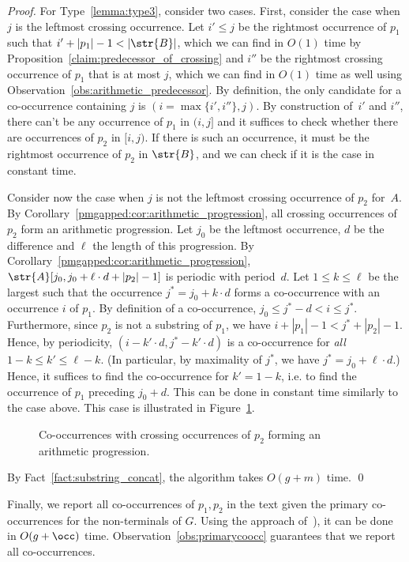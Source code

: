 \begin{proof}
For Type~\ref{lemma:type3}, consider two cases. First, consider the case when $j$ is the leftmost crossing occurrence. Let $i' \le j$ be the rightmost occurrence of $p_1$ such that $i'+|p_1|-1 < |\str{B}|$, which we can find in $O(1)$ time by Proposition~\ref{claim:predecessor_of_crossing} and $i''$ be the rightmost crossing occurrence of $p_1$ that is at most $j$, which we can find in $O(1)$ time as well using Observation~\ref{obs:arithmetic_predecessor}. By definition, the only candidate for a co-occurrence containing $j$ is $(i = \max\{i',i''\},j)$. By construction of~$i'$ and $i''$, there can't be any  occurrence of $p_1$ in $(i,j]$ and it suffices to check whether there are occurrences of $p_2$ in $[i,j)$. If there is such an occurrence, it must be the rightmost occurrence of $p_2$ in $\str{B}$, and we can check if it is the case in constant time. 

Consider now the case when $j$ is not the leftmost crossing occurrence of $p_2$ for~$A$.
By Corollary~\ref{pmgapped:cor:arithmetic_progression}, all crossing occurrences of $p_2$ form an arithmetic progression. Let $j_0$ be the leftmost occurrence, $d$ be the difference and $\ell$ the length of this progression. By Corollary~\ref{pmgapped:cor:arithmetic_progression}, $\str{A}[j_0, j_0+\ell \cdot d+|p_2|-1]$ is periodic with period~$d$. Let $1 \le k \le \ell$ be the largest such that the occurrence $j^\ast = j_0+k \cdot d$ forms a co-occurrence with an occurrence $i$ of $p_1$. By definition of a co-occurrence, $j_0 \le j^\ast-d < i \le j^\ast$. Furthermore, since $p_2$ is not a substring of $p_1$, we have $i+|p_1|-1 < j^\ast+|p_2|-1$. Hence, by periodicity, $(i-k'\cdot d, j^\ast-k' \cdot d)$ is a co-occurrence for \emph{all} $1-k \le k' \le \ell-k$. (In particular, by maximality of $j^\ast$, we have $j^\ast = j_0+\ell\cdot d$.) Hence, it suffices to find the co-occurrence for $k'=1-k$, i.e. to find the occurrence of $p_1$ preceding $j_0+d$. This can be done in constant time similarly to the case above. This case is illustrated in Figure~\ref{fig:p2_crossing_periodic}.


\begin{figure}
\centering
{}
\caption{Co-occurrences with crossing occurrences of $p_2$ forming an arithmetic progression.}
\label{fig:p2_crossing_periodic}
\end{figure}

By Fact~\ref{fact:substring_concat}, the algorithm takes $O(g+m)$ time. 
\qed
\end{proof}
    
Finally, we report all co-occurrences of $p_1,p_2$ in the text given the primary co-occurrences for the non-terminals of $G$. Using the approach of~\cite[Section 6.4]{talg/ChristiansenEKN21}), it can be done in $O(g+\occ)$ time. Observation~\ref{obs:primarycoocc} guarantees that we report all co-occurrences.

